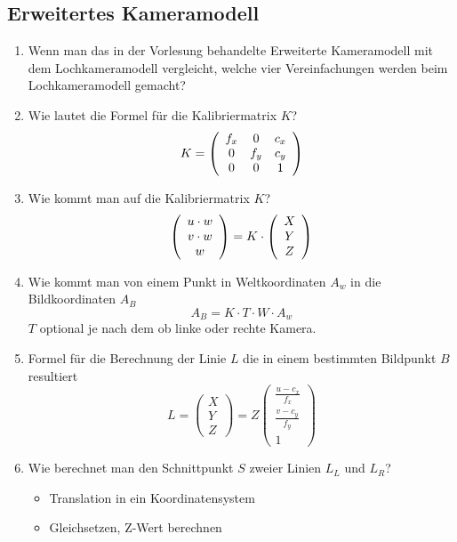 \subsection{Erweitertes Kameramodell}
\begin{enumerate}
	\item Wenn man das in der Vorlesung behandelte Erweiterte Kameramodell mit dem Lochkameramodell vergleicht, welche vier Vereinfachungen werden beim Lochkameramodell gemacht?
  \item Wie lautet die Formel für die Kalibriermatrix $K$? \\
	\begin{equation}
	K = \left( \begin{array}{ccc} f_x & 0 & c_x \\ 0 & f_y & c_y \\ 0 & 0 & 1 \end{array} \right)
	\end{equation}
	\item Wie kommt man auf die Kalibriermatrix $K$? \\
	\begin{equation}
		\left( \begin{array}{c} u \cdot w \\ v \cdot w \\ w \end{array} \right) = K \cdot \left( \begin{array}{c} X \\ Y \\ Z \end{array} \right)
  \end{equation}
  \item Wie kommt man von einem Punkt in Weltkoordinaten $A_w$ in die Bildkoordinaten $A_B$
	\begin{equation}
		A_B=K \cdot T \cdot W \cdot A_w
  \end{equation}
	$T$ optional je nach dem ob linke oder rechte Kamera.
  \item Formel für die Berechnung der Linie $L$ die in einem bestimmten Bildpunkt $B$ resultiert
	\begin{equation}
		L=\left(
		\begin{array}{c}
		X \\
		Y \\
		Z
		\end{array}
  \right)=Z\left(
		\begin{array}{c}
		\frac{u-c_x}{f_x} \\
		\frac{v-c_y}{f_y} \\
		1
		\end{array}\right)
  \end{equation}
  \item Wie berechnet man den Schnittpunkt $S$ zweier Linien $L_L$ und $L_R$?
	\begin{itemize}
		\item Translation in ein Koordinatensystem
		\item Gleichsetzen, Z-Wert berechnen

\end{itemize}
\end{enumerate}
